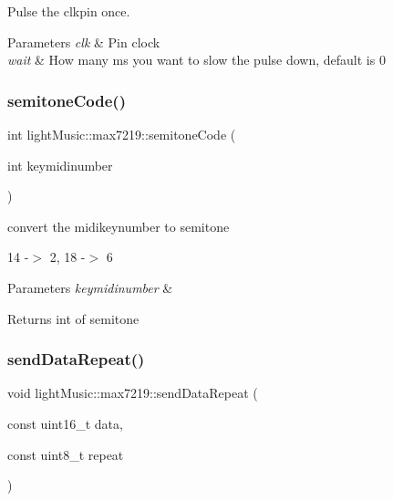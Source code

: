 Pulse the clkpin once. 


\begin{DoxyParams}{Parameters}
{\em clk} & Pin clock \\
\hline
{\em wait} & How many ms you want to slow the pulse down, default is 0 \\
\hline
\end{DoxyParams}
\mbox{\label{classlight_music_1_1max7219_a6e3db6f8018bc2b3248a1226e4e07682}} 
\subsubsection{\texorpdfstring{semitone\+Code()}{semitoneCode()}}
{\footnotesize\ttfamily int light\+Music\+::max7219\+::semitone\+Code (\begin{DoxyParamCaption}\item[{int}]{keymidinumber }\end{DoxyParamCaption})}



convert the midikeynumber to semitone 

14 -\/$>$ 2, 18 -\/$>$ 6 
\begin{DoxyParams}{Parameters}
{\em keymidinumber} & \\
\hline
\end{DoxyParams}
\begin{DoxyReturn}{Returns}
int of semitone 
\end{DoxyReturn}
\mbox{\label{classlight_music_1_1max7219_a8ae67d8bb04df14a5e97b2c080a3ac06}} 
\subsubsection{\texorpdfstring{send\+Data\+Repeat()}{sendDataRepeat()}}
{\footnotesize\ttfamily void light\+Music\+::max7219\+::send\+Data\+Repeat (\begin{DoxyParamCaption}\item[{const uint16\+\_\+t}]{data,  }\item[{const uint8\+\_\+t}]{repeat }\end{DoxyParamCaption})}



